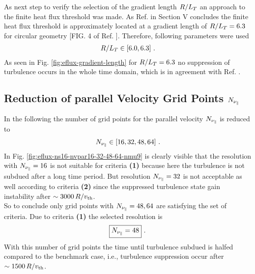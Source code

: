 As next step to verify the selection of the gradient length $R/L_T$ an approach to the finite heat flux threshold was made. As Ref.  in Section V concludes the finite heat flux threshold is approximately located at a gradient length of $R/L_T = 6.3$ for circular geometry [FIG. 4 of Ref. ]. Therefore, following parameters were used
\begin{gather*}
	R/L_T \in [6.0, 6.3]~.
\end{gather*}
As seen in Fig. \ref{fig:eflux-gradient-length} for $R/L_T = 6.3$ no suppression of turbulence occurs in the whole time domain, which is in agreement with Ref. .


\subsection{Reduction of parallel Velocity Grid Points $N_{\nu_\parallel}$}
\label{sub:reduceNvpar}

In the following the number of grid points for the parallel velocity $N_{\nu_\parallel}$ is reduced to
\begin{gather*}
	N_{\nu_\parallel} \in [16, 32, 48, 64]~.
\end{gather*}
In Fig. \ref{fig:eflux-ns16-nvpar16-32-48-64-nmu9} is clearly visible that the resolution with $N_{\nu_\parallel} = 16$ is not suitable for criteria \textbf{(1)} because here the turbulence is not subdued after a long time period. But resolution $N_{\nu_\parallel} = 32$ is not acceptable as well according to criteria \textbf{(2)} since the suppressed turbulence state gain instability after $\sim 3000\,R/v_{\mathrm{th}}$.\\
So to conclude only grid points with $N_{\nu_\parallel} = 48, 64$ are satisfying the set of criteria. Due to criteria \textbf{(1)} the selected resolution is
\begin{gather*}
	\boxed{N_{\nu_\parallel} = 48}~.
\end{gather*}
With this number of grid points the time until turbulence subdued is halfed compared to the benchmark case, i.e., turbulence suppression occur after $\sim 1500\,R/v_{\mathrm{th}}$.


